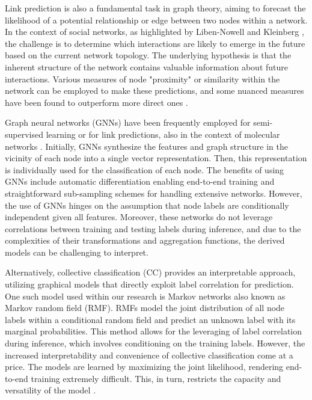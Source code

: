 \documentclass[
11pt, %
oneside, %
english, %
singlespacing, %
headsepline, %
chapterinoneline, %
]{MastersDoctoralThesis} %
\begin{document}
Link prediction is also a fundamental task in graph theory, aiming to forecast the likelihood of a potential relationship or edge between two nodes within a network. In the context of social networks, as highlighted by Liben-Nowell and Kleinberg \cite{liben-nowellLinkPredictionProblem2003}, the challenge is to determine which interactions are likely to emerge in the future based on the current network topology. The underlying hypothesis is that the inherent structure of the network contains valuable information about future interactions. Various measures of node "proximity" or similarity within the network can be employed to make these predictions, and some nuanced measures have been found to outperform more direct ones \cite{zhangLinkPredictionBased2018}.

Graph neural networks (GNNs) \cite{wuGraphNeuralNetworks2022} have been frequently employed for semi-supervised learning or for link predictions, also in the context of molecular networks \cite{oyetundeBoostGAPFILLImprovingFidelity2017}. Initially, GNNs synthesize the features and graph structure in the vicinity of each node into a single vector representation. Then, this representation is individually used for the classification of each node. The benefits of using GNNs include automatic differentiation enabling end-to-end training and straightforward sub-sampling schemes for handling extensive networks. However, the use of GNNs hinges on the assumption that node labels are conditionally independent given all features. Moreover, these networks do not leverage correlations between training and testing labels during inference, and due to the complexities of their transformations and aggregation functions, the derived models can be challenging to interpret.

Alternatively, collective classification (CC) \cite{senCollectiveClassificationNetwork2008} provides an interpretable approach, utilizing graphical models that directly exploit label correlation for prediction. One such model used within our research is Markov networks also known as Markov random field (RMF). RMFs model the joint distribution of all node labels within a conditional random field and predict an unknown label with its marginal probabilities. This method allows for the leveraging of label correlation during inference, which involves conditioning on the training labels. However, the increased interpretability and convenience of collective classification come at a price. The models are learned by maximizing the joint likelihood, rendering end-to-end training extremely difficult. This, in turn, restricts the capacity and versatility of the model \cite{jiaGraphBeliefPropagation2021}.
\end{document}

